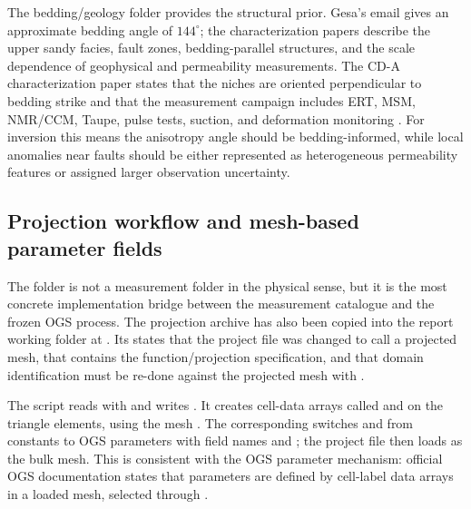 The bedding/geology folder provides the structural prior.  Gesa's email gives an
approximate bedding angle of \(144^\circ\); the characterization papers describe the
upper sandy facies, fault zones, bedding-parallel structures, and the scale dependence
of geophysical and permeability measurements.  The CD-A characterization paper states
that the niches are oriented perpendicular to bedding strike and that the measurement
campaign includes ERT, MSM, NMR/CCM, Taupe, pulse tests, suction, and deformation
monitoring \cite[PDF pp.~2, 4--5]{Ziefle2024Characterization}.  For inversion this
means the anisotropy angle should be bedding-informed, while local anomalies near
faults should be either represented as heterogeneous permeability features or assigned
larger observation uncertainty.

\subsection{Projection workflow and mesh-based parameter fields}

The folder  is not a measurement folder in
the physical sense, but it is the most concrete implementation bridge between the
measurement catalogue and the frozen OGS process.  The projection archive has also
been copied into the report working folder at
.  Its 
states that the project file was changed to call a projected mesh, that
 contains the function/projection specification, and that
 domain identification must be re-done against the projected mesh
with .

The script  reads  with  and
writes  \cite[PDF p.~20]{CDAModellingSlides2025}.  It creates cell-data arrays called
 and  on the triangle elements, using the mesh
.  The corresponding  switches
 and  from constants to OGS  parameters with
field names  and ; the project file then loads
 as the bulk mesh.  This is consistent with the OGS
parameter mechanism: official OGS documentation states that 
parameters are defined by cell-label data arrays in a loaded mesh, selected through
 \cite[Sec.~``MeshElement and MeshNode'']{OpenGeoSysParametersDocs}.

